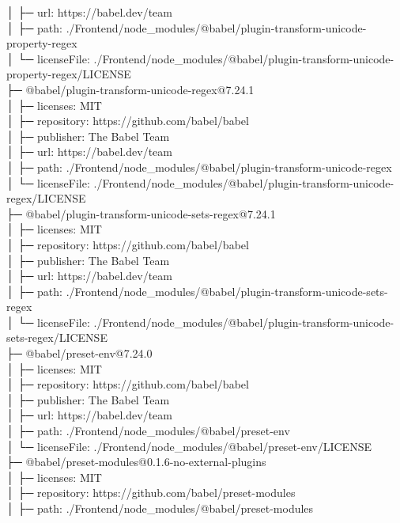 \documentclass[
    paper=a4,
    twoside=false,
    parskip=half,
    listof=entryprefix,
    listof=totoc,
    index=totoc,
    bibliography=totoc,
    headsepline,
]{scrbook}
\begin{document}
    │  ├─ url: https://babel.dev/team\\
    │  ├─ path: ./Frontend/node\_modules/@babel/plugin-transform-unicode-property-regex\\
    │  └─ licenseFile: ./Frontend/node\_modules/@babel/plugin-transform-unicode-property-regex/LICENSE\\
    ├─ @babel/plugin-transform-unicode-regex@7.24.1\\
    │  ├─ licenses: MIT\\
    │  ├─ repository: https://github.com/babel/babel\\
    │  ├─ publisher: The Babel Team\\
    │  ├─ url: https://babel.dev/team\\
    │  ├─ path: ./Frontend/node\_modules/@babel/plugin-transform-unicode-regex\\
    │  └─ licenseFile: ./Frontend/node\_modules/@babel/plugin-transform-unicode-regex/LICENSE\\
    ├─ @babel/plugin-transform-unicode-sets-regex@7.24.1\\
    │  ├─ licenses: MIT\\
    │  ├─ repository: https://github.com/babel/babel\\
    │  ├─ publisher: The Babel Team\\
    │  ├─ url: https://babel.dev/team\\
    │  ├─ path: ./Frontend/node\_modules/@babel/plugin-transform-unicode-sets-regex\\
    │  └─ licenseFile: ./Frontend/node\_modules/@babel/plugin-transform-unicode-sets-regex/LICENSE\\
    ├─ @babel/preset-env@7.24.0\\
    │  ├─ licenses: MIT\\
    │  ├─ repository: https://github.com/babel/babel\\
    │  ├─ publisher: The Babel Team\\
    │  ├─ url: https://babel.dev/team\\
    │  ├─ path: ./Frontend/node\_modules/@babel/preset-env\\
    │  └─ licenseFile: ./Frontend/node\_modules/@babel/preset-env/LICENSE\\
    ├─ @babel/preset-modules@0.1.6-no-external-plugins\\
    │  ├─ licenses: MIT\\
    │  ├─ repository: https://github.com/babel/preset-modules\\
    │  ├─ path: ./Frontend/node\_modules/@babel/preset-modules\\
\end{document}
